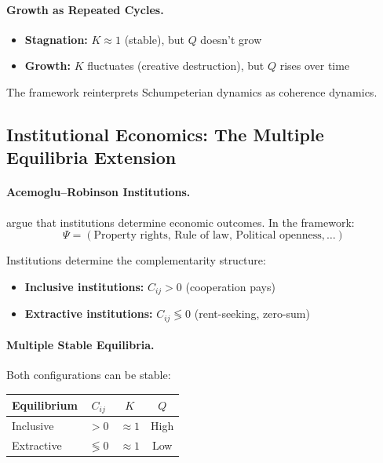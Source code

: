 \documentclass[12pt,a4paper]{article}
\begin{document}
\paragraph{Growth as Repeated Cycles.}
\begin{itemize}
  \item \textbf{Stagnation:} $K \approx 1$ (stable), but $Q$ doesn't grow
  \item \textbf{Growth:} $K$ fluctuates (creative destruction), but $Q$ rises over time
\end{itemize}

The framework reinterprets Schumpeterian dynamics as coherence dynamics.

\subsection{Institutional Economics: The Multiple Equilibria Extension}

\paragraph{Acemoglu--Robinson Institutions.}
\citet{acemoglu} argue that institutions determine economic outcomes.
In the framework:
\begin{equation}
  \Psi = (\text{Property rights, Rule of law, Political openness}, \ldots)
\end{equation}

Institutions determine the complementarity structure:
\begin{itemize}
  \item \textbf{Inclusive institutions:} $C_{ij} > 0$ (cooperation pays)
  \item \textbf{Extractive institutions:} $C_{ij} \lessgtr 0$ (rent-seeking, zero-sum)
\end{itemize}

\paragraph{Multiple Stable Equilibria.}
Both configurations can be stable:
\begin{center}
\renewcommand{\arraystretch}{1.2}
\begin{tabular}{lccc}
\hline
\textbf{Equilibrium} & $C_{ij}$ & $K$ & $Q$ \\
\hline
Inclusive & $> 0$ & $\approx 1$ & High \\
Extractive & $\lessgtr 0$ & $\approx 1$ & Low \\
\hline
\end{tabular}
\end{center}
\end{document}

